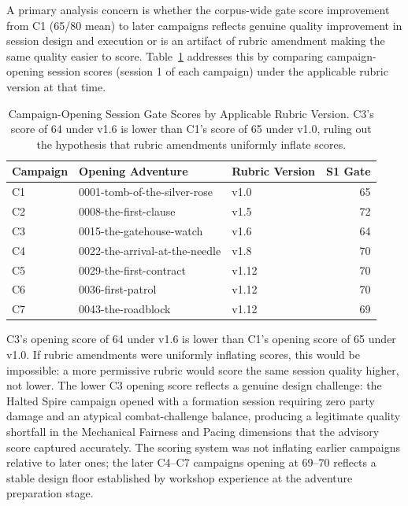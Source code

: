A primary analysis concern is whether the corpus-wide gate score improvement from C1
(65/80 mean) to later campaigns reflects genuine quality improvement in session design
and execution or is an artifact of rubric amendment making the same quality easier to
score. Table~\ref{tab:version-control} addresses this by comparing campaign-opening
session scores (session 1 of each campaign) under the applicable rubric version at
that time.

\begin{table}[t]
\caption{Campaign-Opening Session Gate Scores by Applicable Rubric Version.
  C3's score of 64 under v1.6 is lower than C1's score of 65 under v1.0, ruling out
  the hypothesis that rubric amendments uniformly inflate scores.}
\label{tab:version-control}
\begin{tabular}{@{}lllr@{}}
\toprule
Campaign & Opening Adventure & Rubric Version & S1 Gate \\
\midrule
C1 & 0001-tomb-of-the-silver-rose     & v1.0 & 65 \\
C2 & 0008-the-first-clause            & v1.5 & 72 \\
C3 & 0015-the-gatehouse-watch         & v1.6 & 64 \\
C4 & 0022-the-arrival-at-the-needle   & v1.8 & 70 \\
C5 & 0029-the-first-contract          & v1.12 & 70 \\
C6 & 0036-first-patrol                & v1.12 & 70 \\
C7 & 0043-the-roadblock               & v1.12 & 69 \\
\bottomrule
\end{tabular}
\end{table}

C3's opening score of 64 under v1.6 is lower than C1's opening score of 65 under v1.0.
If rubric amendments were uniformly inflating scores, this would be impossible: a more
permissive rubric would score the same session quality higher, not lower. The lower C3
opening score reflects a genuine design challenge: the Halted Spire campaign opened with
a formation session requiring zero party damage and an atypical combat-challenge balance,
producing a legitimate quality shortfall in the Mechanical Fairness and Pacing dimensions
that the advisory score captured accurately. The scoring system was not inflating
earlier campaigns relative to later ones; the later C4--C7 campaigns opening at 69--70
reflects a stable design floor established by workshop experience at the adventure
preparation stage.


